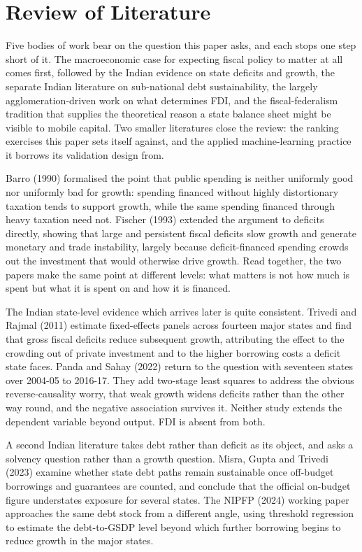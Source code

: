 \documentclass[12pt,a4paper]{article}
\begin{document}
\FloatBarrier
\section{Review of Literature}

Five bodies of work bear on the question this paper asks, and each stops one step short of it. The macroeconomic case for expecting fiscal policy to matter at all comes first, followed by the Indian evidence on state deficits and growth, the separate Indian literature on sub-national debt sustainability, the largely agglomeration-driven work on what determines FDI, and the fiscal-federalism tradition that supplies the theoretical reason a state balance sheet might be visible to mobile capital. Two smaller literatures close the review: the ranking exercises this paper sets itself against, and the applied machine-learning practice it borrows its validation design from.

Barro (1990) formalised the point that public spending is neither uniformly good nor uniformly bad for growth: spending financed without highly distortionary taxation tends to support growth, while the same spending financed through heavy taxation need not. Fischer (1993) extended the argument to deficits directly, showing that large and persistent fiscal deficits slow growth and generate monetary and trade instability, largely because deficit-financed spending crowds out the investment that would otherwise drive growth. Read together, the two papers make the same point at different levels: what matters is not how much is spent but what it is spent on and how it is financed.

The Indian state-level evidence which arrives later is quite consistent. Trivedi and Rajmal (2011) estimate fixed-effects panels across fourteen major states and find that gross fiscal deficits reduce subsequent growth, attributing the effect to the crowding out of private investment and to the higher borrowing costs a deficit state faces. Panda and Sahay (2022) return to the question with seventeen states over 2004-05 to 2016-17. They add two-stage least squares to address the obvious reverse-causality worry, that weak growth widens deficits rather than the other way round, and the negative association survives it. Neither study extends the dependent variable beyond output. FDI is absent from both.

A second Indian literature takes debt rather than deficit as its object, and asks a solvency question rather than a growth question. Misra, Gupta and Trivedi (2023) examine whether state debt paths remain sustainable once off-budget borrowings and guarantees are counted, and conclude that the official on-budget figure understates exposure for several states. The NIPFP (2024) working paper approaches the same debt stock from a different angle, using threshold regression to estimate the debt-to-GSDP level beyond which further borrowing begins to reduce growth in the major states.
\end{document}
